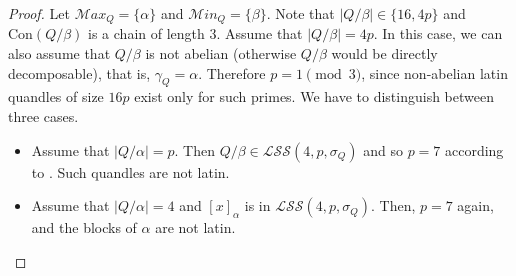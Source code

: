 \documentclass[a4paper, english, 9pt]{amsart}
\theoremstyle{plain}
\theoremstyle{definition}
\def\aut#1{\mathrm{Aut}(#1)}
\def\aff#1{\mathrm{Aff}#1}
\def\con{\mathrm{Con}}
\def\comment#1{{\color{red} #1}}
\def\Z{\mathbb Z}
\def\Ma{\mathcal Max}
\def\ma{\mathcal Min}
\def\LSS{\mathcal{LSS}}
\begin{document}


\begin{proof}


    
    Let $\Ma_Q=\{\alpha\}$ and $\ma_Q=\{\beta\}$. Note that $|Q/\beta|\in \{16,4p\}$ and $\con(Q/\beta)$ is a chain of length $3$. Assume that $|Q/\beta|=4p$. In this case, we can also assume that $Q/\beta$ is not abelian (otherwise $Q/\beta$ would be directly decomposable), that is, $\gamma_Q=\alpha$. Therefore $p=1\pmod{3}$, since non-abelian latin quandles of size $16p$ exist only for such primes. We have to distinguish between three cases.
    \begin{itemize}

    
    \item Assume that $|Q/\alpha|=p$. Then $Q/\beta\in \LSS(4,p,\sigma_Q)$ and so $p=7$ according to \cite[Proposition 5.3]{LSS}. Such quandles are not latin. 
    
        \item Assume that $|Q/\alpha|=4$ and $[x]_\alpha$ is in $\LSS(4,p,\sigma_Q)$. Then, $p=7$ again, and the blocks of $\alpha$ are not latin.  
                
        
        



\end{itemize}
\end{proof}
\end{document}
